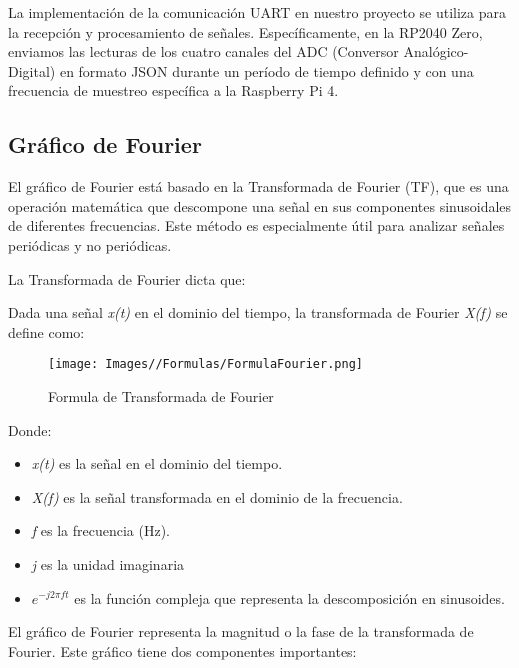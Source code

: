 \documentclass{article}
\begin{document}
La implementación de la comunicación UART en nuestro proyecto se utiliza para la recepción y procesamiento de señales. Específicamente, en la RP2040 Zero, enviamos las lecturas de los cuatro canales del ADC (Conversor Analógico-Digital) en formato JSON durante un período de tiempo definido y con una frecuencia de muestreo específica a la Raspberry Pi 4.

\subsection{Gráfico de Fourier}
El gráfico de Fourier está basado en la Transformada de Fourier (TF), que es una operación matemática que descompone una señal en sus componentes sinusoidales de diferentes frecuencias. Este método es especialmente útil para analizar señales periódicas y no periódicas.

La Transformada de Fourier dicta que: 

Dada una señal \textit{x(t)} en el dominio del tiempo, la transformada de Fourier \textit{X(f)} se define como:

\begin{figure}[H]
    \centering
    \texttt{[image: Images//Formulas/FormulaFourier.png]}
    \caption{Formula de Transformada de Fourier}
    \label{fig:enter-label}
\end{figure}

Donde:
\begin{itemize}
    \item \textit{x(t)} es la señal en el dominio del tiempo.
    \item \textit{X(f)} es la señal transformada en el dominio de la frecuencia.
    \item \textit{f} es la frecuencia (Hz).
    \item \textit{j} es la unidad imaginaria 
    \item $e^{-j2\pi ft}$ es la función compleja que representa la descomposición en sinusoides.

\end{itemize}

El gráfico de Fourier representa la magnitud o la fase de la transformada de Fourier. Este gráfico tiene dos componentes importantes:
\end{document}
